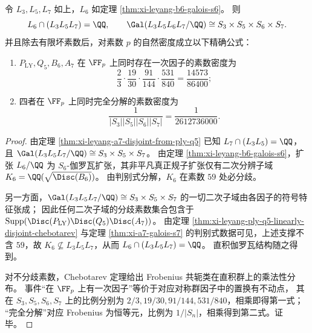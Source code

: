 \begin{theorem}[四层非可解对称群的直积化与联合分解型的素数密度]\label{thm:xi-leyang-s3s5s6s7-product-and-densities}
令 \(L_3,L_5,L_7\) 如上，\(L_6\) 如定理 \ref{thm:xi-leyang-b6-galois-s6}。
则
\[
L_6\cap (L_3L_5L_7)=\QQ,
\qquad
\Gal(L_3L_5L_6L_7/\QQ)\cong S_3\times S_5\times S_6\times S_7.
\]
并且除去有限坏素数后，对素数 \(p\) 的自然密度成立以下精确公式：
\begin{enumerate}
  \item \(P_{\mathrm{LY}},Q_5,B_6,A_7\) 在 \(\FF_p\) 上同时存在一次因子的素数密度为
  \[
  \frac{2}{3}\cdot\frac{19}{30}\cdot\frac{91}{144}\cdot\frac{531}{840}
  =\frac{14573}{86400};
  \]
  \item 四者在 \(\FF_p\) 上同时完全分解的素数密度为
  \[
  \frac{1}{|S_3||S_5||S_6||S_7|}=\frac{1}{2612736000}.
  \]
\end{enumerate}
\end{theorem}
\begin{proof}
由定理 \ref{thm:xi-leyang-a7-disjoint-from-ply-q5} 已知 \(L_7\cap(L_3L_5)=\QQ\)，且 \(\Gal(L_3L_5L_7/\QQ)\cong S_3\times S_5\times S_7\)。
由定理 \ref{thm:xi-leyang-b6-galois-s6}，扩张 \(L_6/\QQ\) 为 \(S_6\)-伽罗瓦扩张，其非平凡真正规子扩张仅有二次分辨子域
\(
K_6=\QQ(\sqrt{\Disc(B_6)})
\)。
由判别式分解，\(K_6\) 在素数 \(59\) 处必分歧。
\par
另一方面，\(\Gal(L_3L_5L_7/\QQ)\cong S_3\times S_5\times S_7\) 的一切二次子域由各因子的符号特征张成；
因此任何二次子域的分歧素数集合包含于
\(\mathrm{Supp}(\Disc(P_{\mathrm{LY}})\Disc(Q_5)\Disc(A_7))\)。
由定理 \ref{thm:xi-leyang-ply-q5-linearly-disjoint-chebotarev} 与定理 \ref{thm:xi-a7-galois-s7} 的判别式数据可见，上述支撑不含 \(59\)，故 \(K_6\not\subseteq L_3L_5L_7\)，从而 \(L_6\cap (L_3L_5L_7)=\QQ\)。
直积伽罗瓦结构随之得到。
\par
对不分歧素数，Chebotarev 定理给出 Frobenius 共轭类在直积群上的乘法性分布。
事件“在 \(\FF_p\) 上有一次因子”等价于对应对称群因子中的置换有不动点，
其在 \(S_3,S_5,S_6,S_7\) 上的比例分别为 \(2/3,19/30,91/144,531/840\)，相乘即得第一式；
“完全分解”对应 Frobenius 为恒等元，比例为 \(1/|S_n|\)，相乘得到第二式。证毕。
\end{proof}

